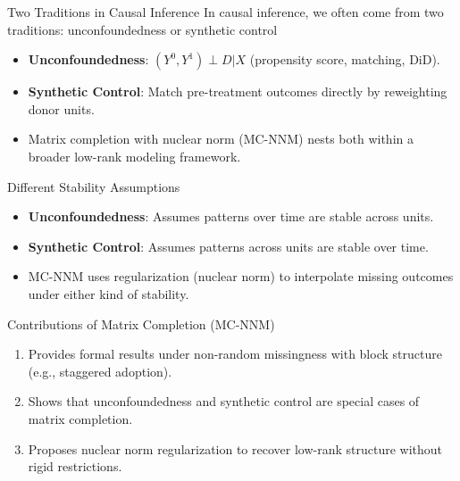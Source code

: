 \documentclass{beamer}
\begin{document}
\begin{frame}{Two Traditions in Causal Inference}
\small
 In causal inference, we often come from two traditions: unconfoundedness or synthetic control

\begin{itemize}
  \item \textbf{Unconfoundedness}: $(Y^0, Y^1) \perp D | X$ (propensity score, matching, DiD).
  \item \textbf{Synthetic Control}: Match pre-treatment outcomes directly by reweighting donor units.
  \item Matrix completion with nuclear norm (MC-NNM) nests both within a broader low-rank modeling framework.
\end{itemize}
\end{frame}




\begin{frame}{Different Stability Assumptions}
\small
\begin{itemize}
  \item \textbf{Unconfoundedness}: Assumes patterns over time are stable across units.
  \item \textbf{Synthetic Control}: Assumes patterns across units are stable over time.
  \item MC-NNM uses regularization (nuclear norm) to interpolate missing outcomes under either kind of stability.
\end{itemize}
\end{frame}



\begin{frame}{Contributions of Matrix Completion (MC-NNM)}
\small
\begin{enumerate}
  \item Provides formal results under non-random missingness with block structure (e.g., staggered adoption).
  \item Shows that unconfoundedness and synthetic control are special cases of matrix completion.
  \item Proposes nuclear norm regularization to recover low-rank structure without rigid restrictions.
\end{enumerate}
\end{frame}
\end{document}
